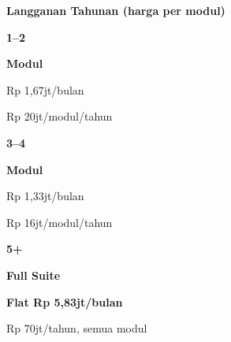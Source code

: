 \documentclass[a4paper]{article}
\begin{document}
\noindent
\colorbox{BlueBg}{%
\begin{minipage}{\dimexpr\textwidth-2\fboxsep\relax}
\vspace{4pt}

\begin{center}
{\fontsize{10}{13}\selectfont\bfseries\color{BluePrimary} Langganan Tahunan (harga per modul)}
\end{center}\vspace{4pt}

\noindent
\begin{minipage}[t][2.2cm][c]{0.31\textwidth}
\begin{center}
{\fontsize{16}{20}\selectfont\bfseries\color{BluePrimary} 1--2}\par\vspace{2pt}
{\fontsize{10}{13}\selectfont\bfseries\color{BlueDark} Modul}\par\vspace{3pt}
{\fontsize{9}{12}\selectfont\color{TextDark}Rp 1,67jt/bulan}\par
{\fontsize{8}{10}\selectfont\color{TextLight}Rp 20jt/modul/tahun}
\end{center}
\end{minipage}%
\hfill
\begin{minipage}[t][2.2cm][c]{0.31\textwidth}
\begin{center}
{\fontsize{16}{20}\selectfont\bfseries\color{BluePrimary} 3--4}\par\vspace{2pt}
{\fontsize{10}{13}\selectfont\bfseries\color{BlueDark} Modul}\par\vspace{3pt}
{\fontsize{9}{12}\selectfont\color{TextDark}Rp 1,33jt/bulan}\par
{\fontsize{8}{10}\selectfont\color{TextLight}Rp 16jt/modul/tahun}
\end{center}
\end{minipage}%
\hfill
\begin{minipage}[t][2.2cm][c]{0.31\textwidth}
\begin{center}
{\fontsize{16}{20}\selectfont\bfseries\color{BluePrimary} 5+}\par\vspace{2pt}
{\fontsize{10}{13}\selectfont\bfseries\color{BlueDark} Full Suite}\par\vspace{3pt}
{\fontsize{9}{12}\selectfont\color{TextDark}\textbf{Flat Rp 5,83jt/bulan}}\par
{\fontsize{8}{10}\selectfont\color{TextLight}Rp 70jt/tahun, semua modul}
\end{center}
\end{minipage}


\end{minipage}}
\end{document}
